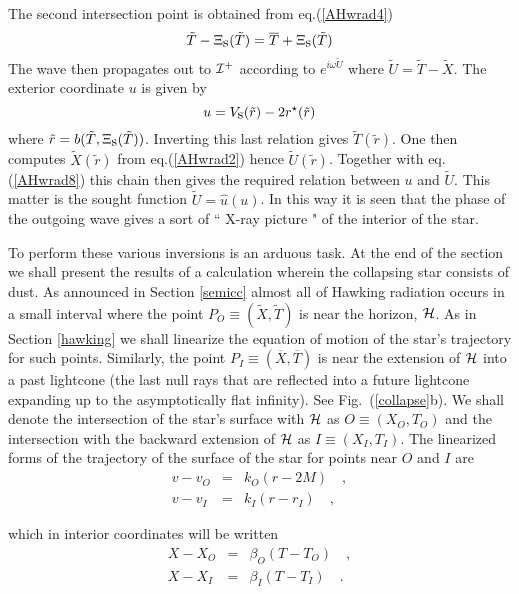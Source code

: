 \documentclass[12pt,oneside]{report}
\def\beq {\begin{equation}}
\def\feq {\end{equation}}
\begin{document}
\noindent The second intersection point is obtained from eq.(\ref{AHwrad4})
\beq {\tilde T} - \Xi_{\mbox{\rm s}} ({\tilde T}) = {\overline T} +
\Xi_{\mbox{\rm s}} ({\tilde T}) \label{AHwrad7} \feq
\noindent The wave then propagates out to $ {\cal I}^+$
according to $ e^{i \omega {\tilde U} }$ where $ {\tilde U} =
{\tilde T} - {\tilde X}$. The exterior coordinate $u$ is given
by
\beq u = V_{\mbox{\rm s}} ({\tilde r}) - 2 r^{\star} ({\tilde r}) \label{AHwrad8} \feq
\noindent where $ {\tilde r} = b ({\tilde T}, \Xi_{\mbox{\rm s}} ({\tilde
T}))$. Inverting this last relation gives $ {\tilde T}
({\tilde r})$. One then computes $ {\tilde X}({\tilde r})$
from eq.(\ref{AHwrad2}) hence $ {\tilde U}({\tilde r})$. Together with eq.(\ref{AHwrad8})
this chain then gives the required relation between $u$ and ${\tilde U}$.
This matter is the sought function ${\tilde U}= {\hat u} (u)$. In this
way it is seen that the phase of the outgoing wave gives a
sort of `` X-ray picture " of the interior of the star.


To perform these various inversions is an arduous task. At the
end of the section we shall present  the results of a calculation
wherein the collapsing star consists of dust. As announced in Section
\ref{semicc}  almost all of Hawking radiation occurs in
a small interval where the point $P_O \equiv ({\tilde X}, {\tilde T}) $ is
near the horizon, ${\cal H}$. As in Section \ref{hawking} we shall
linearize the equation of motion of the star's trajectory for
such points. Similarly, the point $P_I \equiv  ({\overline X}, {\overline
T}) $ is near the extension of ${\cal H}$ into a past lightcone (the
last null rays that are reflected into a future lightcone expanding up to the
asymptotically flat infinity). See Fig.~(\ref{collapse}b). We shall denote the
intersection of the star's surface with ${\cal H}$ as $O\equiv (X_O, T_O) $ and
the intersection with the backward extension of ${\cal H}$ as $I\equiv(X_I, T_I)$.
 The linearized forms of the trajectory of the surface of the star for points
near $O$ and $I$ are
\begin{eqnarray}
v - v_O &=& k_O (r - 2 M) \quad ,\nonumber \\
v - v_I &=& k_I (r - r_I) \quad ,  \label{AHwrad9}
\end{eqnarray}

\noindent which in interior coordinates  will be written
\begin{eqnarray}
X - X_O &=& \beta_O (T - T_O)\quad ,  \nonumber \\
X - X_I &=& \beta_I (T - T_I) \quad . \label{AHwrad10}
\end{eqnarray} 
\end{document}
